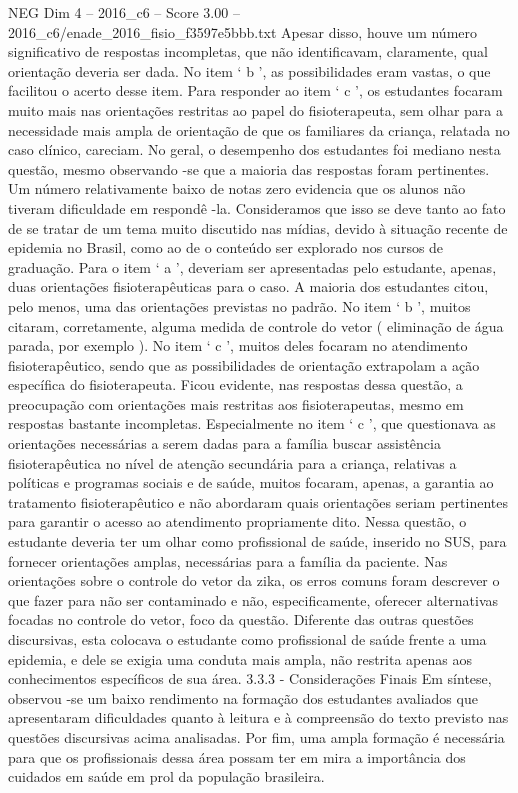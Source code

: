 \begin{textsample}{NEG Dim 4 – 2016\_c6 – Score 3.00 – 2016\_c6/enade\_2016\_fisio\_f3597e5bbb.txt}
Apesar disso, houve um número significativo de respostas incompletas, que não identificavam, claramente, qual orientação deveria ser dada.
No item ‘ b ’, as possibilidades eram vastas, o que facilitou o acerto desse item.
Para responder ao item ‘ c ’, os estudantes focaram muito mais nas orientações restritas ao papel do fisioterapeuta, sem olhar para a necessidade mais ampla de orientação de que os familiares da criança, relatada no caso clínico, careciam.
No geral, o desempenho dos estudantes foi mediano nesta questão, mesmo observando -se que a maioria das respostas foram pertinentes.
Um número relativamente baixo de notas zero evidencia que os alunos não tiveram dificuldade em respondê -la.
Consideramos que isso se deve tanto ao fato de se tratar de um tema muito discutido nas mídias, devido à situação recente de epidemia no Brasil, como ao de o conteúdo ser explorado nos cursos de graduação.
Para o item ‘ a ’, deveriam ser apresentadas pelo estudante, apenas, duas orientações fisioterapêuticas para o caso.
A maioria dos estudantes citou, pelo menos, uma das orientações previstas no padrão.
No item ‘ b ’, muitos citaram, corretamente, alguma medida de controle do vetor ( eliminação de água parada, por exemplo ).
No item ‘ c ’, muitos deles focaram no atendimento fisioterapêutico, sendo que as possibilidades de orientação extrapolam a ação específica do fisioterapeuta.
Ficou evidente, nas respostas dessa questão, a preocupação com orientações mais restritas aos fisioterapeutas, mesmo em respostas bastante incompletas.
Especialmente no item ‘ c ’, que questionava as orientações necessárias a serem dadas para a família buscar assistência fisioterapêutica no nível de atenção secundária para a criança, relativas a políticas e programas sociais e de saúde, muitos focaram, apenas, a garantia ao tratamento fisioterapêutico e não abordaram quais orientações seriam pertinentes para garantir o acesso ao atendimento propriamente dito.
Nessa questão, o estudante deveria ter um olhar como profissional de saúde, inserido no SUS, para fornecer orientações amplas, necessárias para a família da paciente.
Nas orientações sobre o controle do vetor da zika, os erros comuns foram descrever o que fazer para não ser contaminado e não, especificamente, oferecer alternativas focadas no controle do vetor, foco da questão.
Diferente das outras questões discursivas, esta colocava o estudante como profissional de saúde frente a uma epidemia, e dele se exigia uma conduta mais ampla, não restrita apenas aos conhecimentos específicos de sua área. 3.3.3 - Considerações Finais Em síntese, observou -se um baixo rendimento na formação dos estudantes avaliados que apresentaram dificuldades quanto à leitura e à compreensão do texto previsto nas questões discursivas acima analisadas.
Por fim, uma ampla formação é necessária para que os profissionais dessa área possam ter em mira a importância dos cuidados em saúde em prol da população brasileira.

\end{textsample}
